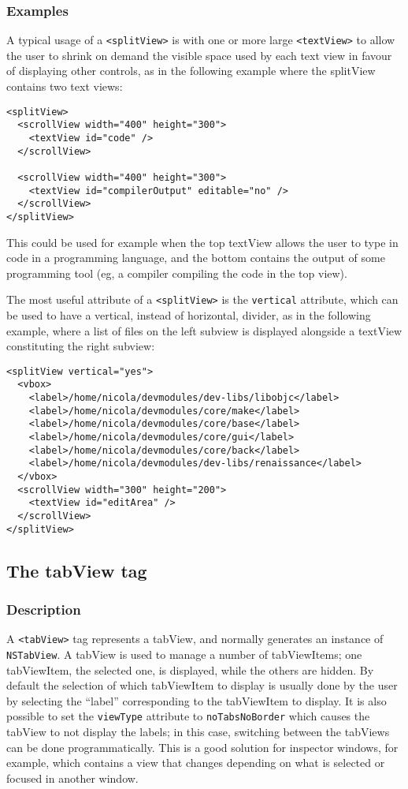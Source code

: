 \subsubsection{Examples}
A typical usage of a \texttt{<splitView>} is with one or more large
\texttt{<textView>} to allow the user to shrink on demand the visible
space used by each text view in favour of displaying other controls,
as in the following example where the splitView contains two text
views:
\begin{verbatim}
<splitView>
  <scrollView width="400" height="300">
    <textView id="code" />
  </scrollView>

  <scrollView width="400" height="300">
    <textView id="compilerOutput" editable="no" />
  </scrollView>
</splitView>
\end{verbatim}
This could be used for example when the top textView allows the user
to type in code in a programming language, and the bottom contains the
output of some programming tool (eg, a compiler compiling the code in
the top view).

The most useful attribute of a \texttt{<splitView>} is the
\texttt{vertical} attribute, which can be used to have a vertical,
instead of horizontal, divider, as in the following example, where a
list of files on the left subview is displayed alongside a textView
constituting the right subview:
\begin{verbatim}
<splitView vertical="yes">
  <vbox>
    <label>/home/nicola/devmodules/dev-libs/libobjc</label>
    <label>/home/nicola/devmodules/core/make</label>
    <label>/home/nicola/devmodules/core/base</label>
    <label>/home/nicola/devmodules/core/gui</label>
    <label>/home/nicola/devmodules/core/back</label>
    <label>/home/nicola/devmodules/dev-libs/renaissance</label>
  </vbox>
  <scrollView width="300" height="200">
    <textView id="editArea" />
  </scrollView>
</splitView>
\end{verbatim}

\subsection{The tabView tag}

\subsubsection{Description}
A \texttt{<tabView>} tag represents a tabView, and normally generates
an instance of \texttt{NSTabView}.  A tabView is used to manage a
number of tabViewItems; one tabViewItem, the selected one, is
displayed, while the others are hidden.  By default the selection of
which tabViewItem to display is usually done by the user by selecting
the ``label'' corresponding to the tabViewItem to display.  It is also
possible to set the \texttt{viewType} attribute to
\texttt{noTabsNoBorder} which causes the tabView to not display the
labels; in this case, switching between the tabViews can be done
programmatically.  This is a good solution for inspector windows, for
example, which contains a view that changes depending on what is
selected or focused in another window.

